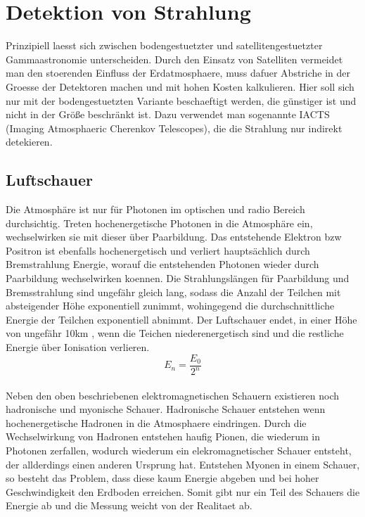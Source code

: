\section{Detektion von Strahlung}
Prinzipiell laesst sich zwischen bodengestuetzter und satellitengestuetzter Gammaastronomie unterscheiden. Durch den Einsatz von Satelliten vermeidet man den stoerenden Einfluss der Erdatmosphaere, muss dafuer Abstriche in der Groesse der Detektoren machen und mit hohen Kosten kalkulieren. Hier soll sich nur mit der bodengestuetzten Variante beschaeftigt werden, die günstiger ist und nicht in der Größe beschränkt ist. Dazu verwendet man sogenannte IACTS (Imaging Atmosphaeric Cherenkov Telescopes), die die Strahlung nur indirekt detekieren.

\subsection{Luftschauer}
Die Atmosphäre ist nur für Photonen im optischen und radio Bereich durchsichtig. Treten hochenergetische Photonen in die Atmosphäre ein, wechselwirken sie mit dieser über Paarbildung. Das entstehende Elektron bzw Positron ist ebenfalls hochenergetisch und verliert hauptsächlich durch Bremstrahlung Energie, worauf die entstehenden Photonen wieder durch Paarbildung wechselwirken koennen. Die Strahlungslängen für Paarbildung und Bremsstrahlung sind ungefähr gleich lang, sodass die Anzahl der Teilchen mit absteigender Höhe exponentiell zunimmt, wohingegend die durchschnittliche Energie der Teilchen exponentiell abnimmt. Der Luftschauer endet, in einer Höhe von ungefähr 10km \cite{iwas}, wenn die Teichen niederenergetisch sind und die restliche Energie über Ionisation verlieren.
\begin{equation}
E_n=\frac{E_0}{2^n}
\end{equation}\\
Neben den oben beschriebenen elektromagnetischen Schauern existieren noch hadronische und myonische Schauer. Hadronische Schauer entstehen wenn hochenergetische Hadronen in die Atmosphaere eindringen. Durch die Wechselwirkung von Hadronen entstehen haufig Pionen, die wiederum in Photonen zerfallen, wodurch wiederum ein elekromagnetischer Schauer entsteht, der allderdings einen anderen Ursprung hat. Entstehen Myonen in einem Schauer, so besteht das Problem, dass diese kaum Energie abgeben und bei hoher Geschwindigkeit den Erdboden erreichen. Somit gibt nur ein Teil des Schauers die Energie ab und die Messung weicht von der Realitaet ab.


